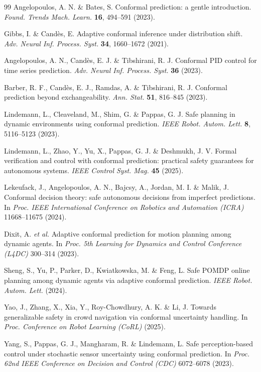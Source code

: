 \begin{thebibliography}{99}
 Angelopoulos, A. N. \& Bates, S. Conformal prediction: a gentle introduction. \textit{Found. Trends Mach. Learn.} \textbf{16}, 494--591 (2023).

 Gibbs, I. \& Cand\`es, E. Adaptive conformal inference under distribution shift. \textit{Adv. Neural Inf. Process. Syst.} \textbf{34}, 1660--1672 (2021).

 Angelopoulos, A. N., Cand\`es, E. J. \& Tibshirani, R. J. Conformal PID control for time series prediction. \textit{Adv. Neural Inf. Process. Syst.} \textbf{36} (2023).

 Barber, R. F., Cand\`es, E. J., Ramdas, A. \& Tibshirani, R. J. Conformal prediction beyond exchangeability. \textit{Ann. Stat.} \textbf{51}, 816--845 (2023).

 Lindemann, L., Cleaveland, M., Shim, G. \& Pappas, G. J. Safe planning in dynamic environments using conformal prediction. \textit{IEEE Robot. Autom. Lett.} \textbf{8}, 5116--5123 (2023).

 Lindemann, L., Zhao, Y., Yu, X., Pappas, G. J. \& Deshmukh, J. V. Formal verification and control with conformal prediction: practical safety guarantees for autonomous systems. \textit{IEEE Control Syst. Mag.} \textbf{45} (2025).

 Lekeufack, J., Angelopoulos, A. N., Bajcsy, A., Jordan, M. I. \& Malik, J. Conformal decision theory: safe autonomous decisions from imperfect predictions. In \textit{Proc. IEEE International Conference on Robotics and Automation (ICRA)} 11668--11675 (2024).

 Dixit, A. \textit{et al.} Adaptive conformal prediction for motion planning among dynamic agents. In \textit{Proc. 5th Learning for Dynamics and Control Conference (L4DC)} 300--314 (2023).

 Sheng, S., Yu, P., Parker, D., Kwiatkowska, M. \& Feng, L. Safe POMDP online planning among dynamic agents via adaptive conformal prediction. \textit{IEEE Robot. Autom. Lett.} (2024).

 Yao, J., Zhang, X., Xia, Y., Roy-Chowdhury, A. K. \& Li, J. Towards generalizable safety in crowd navigation via conformal uncertainty handling. In \textit{Proc. Conference on Robot Learning (CoRL)} (2025).

 Yang, S., Pappas, G. J., Mangharam, R. \& Lindemann, L. Safe perception-based control under stochastic sensor uncertainty using conformal prediction. In \textit{Proc. 62nd IEEE Conference on Decision and Control (CDC)} 6072--6078 (2023).


\end{thebibliography}
